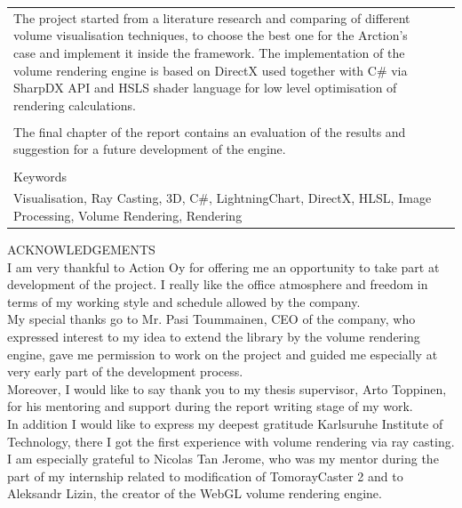 \documentclass[english]{report}
\begin{document}
\begin{table}[!h]
\begin{tabular}{| l | l | l | l |}
{The project started from a literature research and comparing of different volume visualisation techniques, to choose the best one for the Arction's case and implement it inside the framework. The implementation of the volume rendering engine is based on DirectX used together with C\# via SharpDX API and HSLS shader language for low level optimisation of rendering calculations.
}\\
\multicolumn{4}{|l|}{ }\\
\multicolumn{4}{|p{14cm}|}{
The final chapter of the report contains an evaluation of the results and suggestion for a future development of the engine.
}\\
\multicolumn{4}{|l|}{ }\\
\hline
\multicolumn{4}{|l|}{Keywords}\\
\multicolumn{4}{|p{14cm}|}{Visualisation, Ray Casting, 3D, C\#, LightningChart, DirectX, HLSL, Image Processing, Volume Rendering, Rendering}\\
\hline
\end{tabular}
\end{table}

\newpage

ACKNOWLEDGEMENTS\\

I am very thankful to Action Oy for offering me an opportunity to take part at development of the project. I really like the office atmosphere and freedom in terms of my working style and schedule allowed by the company.\\

My special thanks go to Mr. Pasi Toummainen, CEO of the company, who expressed interest to my idea to extend the library by the volume rendering engine,  gave me permission to work on the project and guided me especially at very early part of the development process.\\

Moreover, I would like to say thank you to my thesis supervisor, Arto Toppinen, for his mentoring and support during the report writing stage of my work. \\

In addition I would like to express my deepest gratitude Karlsuruhe Institute of Technology, there I got the first experience with volume rendering via ray casting. I am especially grateful to Nicolas Tan Jerome, who was my mentor during the part of my internship related to modification of TomorayCaster 2 and to Aleksandr Lizin, the creator of the WebGL volume rendering engine.
\end{document}
